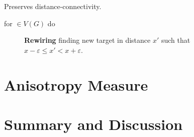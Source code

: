 \begin{proposition}
Preserves distance-connectivity.
\end{proposition}



for $\in V(G)$ do 


\vspace{0.5cm}
\begin{figure}[!htbp]
  \centering 
  \caption{\textbf{Rewiring} finding new target in distance $x'$ such
    that $x-\varepsilon \leq x' < x+\varepsilon$.}%
  \label{fig:distance_rewiring}
\end{figure}

 

\section{Anisotropy Measure}




\section{Summary and Discussion}













